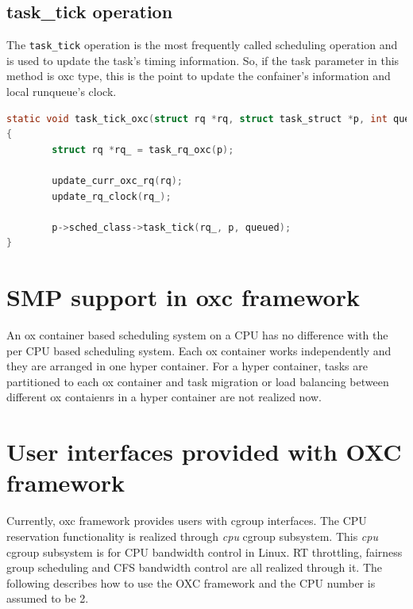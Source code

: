 \subsection{task\_tick operation}
The \texttt{task\_tick} operation is the most frequently called scheduling 
operation and is used to update the task's timing information. So, if
the task parameter in this method is oxc type, this is the point to
update the confainer's information and local runqueue's clock.
\begin{lstlisting}[language=C, label={list:task_tick}]
static void task_tick_oxc(struct rq *rq, struct task_struct *p, int queued)
{
        struct rq *rq_ = task_rq_oxc(p);

        update_curr_oxc_rq(rq);
        update_rq_clock(rq_);

        p->sched_class->task_tick(rq_, p, queued);
}
\end{lstlisting}

\section{SMP support in oxc framework}
An ox container based scheduling system on a CPU has no difference with the 
per CPU based scheduling system. Each ox container works independently and
they are arranged in one hyper container. For a hyper container, tasks are
partitioned to each ox container and task migration or load balancing between 
different ox contaienrs in a hyper container are not realized now.

\section{User interfaces provided with OXC framework}
Currently, oxc framework provides users with cgroup interfaces.
The CPU reservation functionality is realized through \emph{cpu} cgroup 
subsystem. This \emph{cpu} cgroup subsystem is for CPU bandwidth control
in Linux. RT throttling, fairness group scheduling and CFS bandwidth control
are all realized through it. The following describes how to use the OXC 
framework and the CPU number is assumed to be 2.

